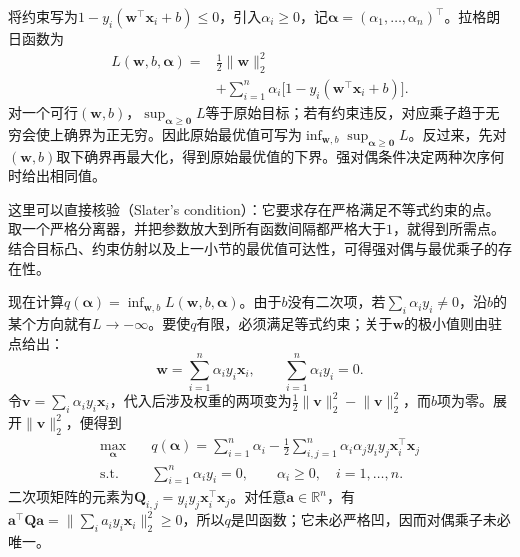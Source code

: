 将约束写为$1-y_i(\bm{w}^{\top}\bm{x}_i+b)\le0$，引入$\alpha_i\ge0$，记$\bm{\alpha}=(\alpha_1,\ldots,\alpha_n)^{\top}$。拉格朗日函数为
\begin{equation}
  \begin{aligned}
    L(\bm{w},b,\bm{\alpha})
    ={}&\frac12\lVert\bm{w}\rVert_2^2\\
      &+\sum_{i=1}^n\alpha_i
        \bigl[1-y_i(\bm{w}^{\top}\bm{x}_i+b)\bigr].
  \end{aligned}
  \label{eq:classification-svm-hard-lagrangian}
\end{equation}
对一个可行$(\bm{w},b)$，$\sup_{\bm{\alpha}\ge\bm{0}}L$等于原始目标；若有约束违反，对应乘子趋于无穷会使上确界为正无穷。因此原始最优值可写为$\inf_{\bm{w},b}\sup_{\bm{\alpha}\ge\bm{0}}L$。反过来，先对$(\bm{w},b)$取下确界再最大化，得到原始最优值的下界。强对偶条件决定两种次序何时给出相同值。

这里可以直接核验（Slater's condition）：它要求存在严格满足不等式约束的点。取一个严格分离器，并把参数放大到所有函数间隔都严格大于$1$，就得到所需点。结合目标凸、约束仿射以及上一小节的最优值可达性，可得强对偶与最优乘子的存在性。

现在计算$q(\bm{\alpha})=\inf_{\bm{w},b}L(\bm{w},b,\bm{\alpha})$。由于$b$没有二次项，若$\sum_i\alpha_i y_i\ne0$，沿$b$的某个方向就有$L\to-\infty$。要使$q$有限，必须满足等式约束；关于$\bm{w}$的极小值则由驻点给出：
\begin{equation}
  \bm{w}=\sum_{i=1}^n\alpha_i y_i\bm{x}_i,
  \qquad
  \sum_{i=1}^n\alpha_i y_i=0.
  \label{eq:classification-svm-stationarity}
\end{equation}
令$\bm{v}=\sum_i\alpha_i y_i\bm{x}_i$，代入后涉及权重的两项变为$\frac12\lVert\bm{v}\rVert_2^2-\lVert\bm{v}\rVert_2^2$，而$b$项为零。展开$\lVert\bm{v}\rVert_2^2$，便得到
\begin{equation}
  \begin{aligned}
    \max_{\bm{\alpha}}\quad&
      q(\bm{\alpha})
      =\sum_{i=1}^n\alpha_i
       -\frac12\sum_{i,j=1}^n
          \alpha_i\alpha_j y_i y_j
          \bm{x}_i^{\top}\bm{x}_j\\
    \text{s.t.}\quad&
      \sum_{i=1}^n\alpha_i y_i=0,\qquad
      \alpha_i\ge0,\quad i=1,\ldots,n.
  \end{aligned}
  \label{eq:classification-svm-hard-dual}
\end{equation}
二次项矩阵的元素为$\bm{Q}_{i,j}=y_i y_j\bm{x}_i^{\top}\bm{x}_j$。对任意$\bm{a}\in\mathbb{R}^n$，有$\bm{a}^{\top}\bm{Q}\bm{a}=\lVert\sum_i a_i y_i\bm{x}_i\rVert_2^2\ge0$，所以$q$是凹函数；它未必严格凹，因而对偶乘子未必唯一。


